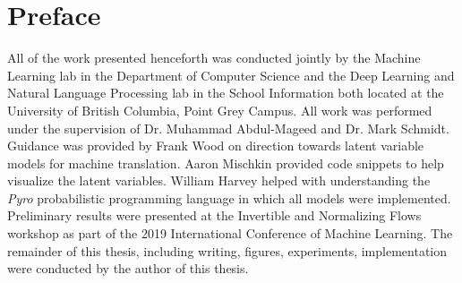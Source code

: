 
\chapter{Preface}

All of the work presented henceforth was conducted jointly by the Machine Learning lab in the Department of Computer Science and the Deep Learning and Natural Language Processing lab in the School Information both located at the University of British Columbia, Point Grey Campus. All work was performed under the supervision of Dr. Muhammad Abdul-Mageed and Dr. Mark Schmidt. Guidance was provided by Frank Wood on direction towards latent variable models for machine translation. Aaron Mischkin provided code snippets to help visualize the latent variables. William Harvey helped with understanding the \textit{Pyro} probabilistic programming language in which all models were implemented. Preliminary results were presented at the Invertible and Normalizing Flows workshop as part of the 2019 International Conference of Machine Learning. The remainder of this thesis, including writing, figures, experiments, implementation were conducted by the author of this thesis.

